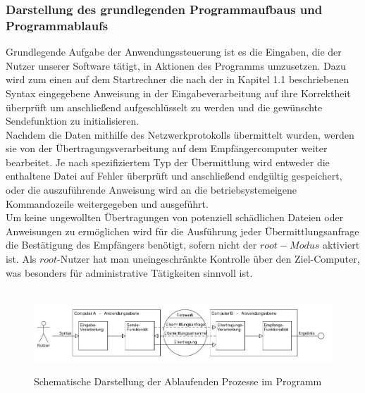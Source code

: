 \subsubsection{Darstellung des grundlegenden Programmaufbaus und Programmablaufs}
Grundlegende Aufgabe der Anwendungssteuerung ist es die Eingaben, die der Nutzer unserer Software tätigt, in Aktionen des Programms umzusetzen. 
Dazu wird zum einen auf dem Startrechner die nach der in Kapitel 1.1 beschriebenen Syntax eingegebene Anweisung in der Eingabeverarbeitung auf ihre Korrektheit überprüft um anschließend aufgeschlüsselt zu werden und die gewünschte Sendefunktion zu initialisieren.\\
Nachdem die Daten mithilfe des Netzwerkprotokolls übermittelt wurden, werden sie von der Übertragungsverarbeitung auf dem Empfängercomputer weiter bearbeitet. Je nach spezifiziertem Typ der Übermittlung wird entweder die enthaltene Datei auf Fehler überprüft und anschließend endgültig gespeichert, oder die auszuführende Anweisung wird an die betriebsystemeigene Kommandozeile weitergegeben und ausgeführt.\\
Um keine ungewollten Übertragungen von potenziell schädlichen Dateien oder Anweisungen zu ermöglichen wird für die Ausführung jeder Übermittlungsanfrage die Bestätigung des Empfängers benötigt, sofern nicht der $root-Modus$ aktiviert ist. Als $root$-Nutzer hat man uneingeschränkte Kontrolle über den Ziel-Computer, was besonders für administrative Tätigkeiten sinnvoll ist.\\\hfill\\ 
\begin{figure}[h!]
\includegraphics[scale=.45]{anw.jpg}
\label{anw}
\caption{Schematische Darstellung der Ablaufenden Prozesse im Programm}
\end{figure}

